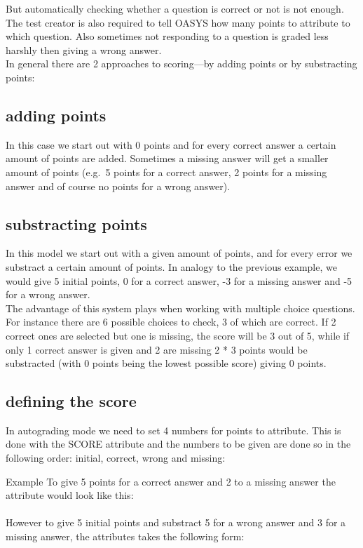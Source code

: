 \documentclass[12pt]{article} %
\begin{document}
But automatically checking whether a question is correct or not is not enough.
The test creator is also required to tell OASYS how many points to attribute to which question.
Also sometimes not responding to a question is graded less harshly then giving a wrong answer. \\

In general there are 2 approaches to scoring—by adding points or by substracting points: 

\subsection{adding points}\label{subsec:adding-points}
In this case we start out with 0 points and for every correct answer a certain amount of points are added.
Sometimes a missing answer will get a smaller amount of points (e.g.\ 5 points for a correct answer, 2 points for a missing answer and of course no points for a wrong answer).

\subsection{substracting points}\label{subsec:substracting-points}
In this model we start out with a given amount of points, and for every error we substract a certain amount of points.
In analogy to the previous example, we would give 5 initial points, 0 for a correct answer, -3 for a missing answer and -5 for a wrong answer.\\

The advantage of this system plays when working with multiple choice questions.
For instance there are 6 possible choices to check, 3 of which are correct.
If 2 correct ones are selected but one is missing, the score will be 3 out of 5, while if only 1 correct answer is given and 2 are missing 2 * 3 points would be substracted (with 0 points being the lowest possible score) giving 0 points.

\subsection{defining the score}\label{subsec:defining-the-score}

In autograding mode we need to set 4 numbers for points to attribute.
This is done with the SCORE attribute and the numbers to be given are done so in the following order:  initial, correct, wrong and missing:

\begin{exampleBox}{Example}
To give 5 points for a correct answer and 2 to a missing answer the attribute would look like this:\\

\\

However to give 5 initial points and substract 5 for a wrong answer and 3 for a missing answer, the attributes takes the following form: \\


\end{exampleBox}
\vspace{0.5cm}
\end{document}
